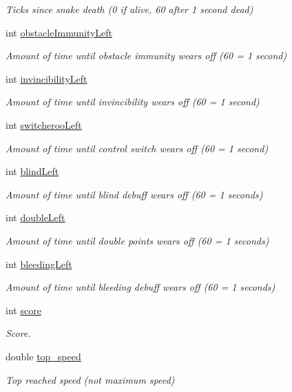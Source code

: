 \begin{DoxyCompactItemize}
\begin{DoxyCompactList}\small\item\em Ticks since snake death (0 if alive, 60 after 1 second dead) \end{DoxyCompactList}\item 
int \mbox{\hyperlink{group__snake_ga7296bc0cf6f2410a20eb48fda726a8f6}{obstacle\+Immunity\+Left}}
\begin{DoxyCompactList}\small\item\em Amount of time until obstacle immunity wears off (60 = 1 second) \end{DoxyCompactList}\item 
int \mbox{\hyperlink{group__snake_gae942bd8af663886b8e1c4274062174b5}{invincibility\+Left}}
\begin{DoxyCompactList}\small\item\em Amount of time until invincibility wears off (60 = 1 second) \end{DoxyCompactList}\item 
int \mbox{\hyperlink{group__snake_ga66233a102458e305c73cbfdb6d40100f}{switcheroo\+Left}}
\begin{DoxyCompactList}\small\item\em Amount of time until control switch wears off (60 = 1 second) \end{DoxyCompactList}\item 
int \mbox{\hyperlink{group__snake_gadc0bae4f8aea84e975419c3186008be3}{blind\+Left}}
\begin{DoxyCompactList}\small\item\em Amount of time until blind debuff wears off (60 = 1 seconds) \end{DoxyCompactList}\item 
int \mbox{\hyperlink{group__snake_gadc6fa6383ebace6fbeb2e6a2ebcbb04a}{double\+Left}}
\begin{DoxyCompactList}\small\item\em Amount of time until double points wears off (60 = 1 seconds) \end{DoxyCompactList}\item 
int \mbox{\hyperlink{group__snake_ga7b1c76ccd41a023734f3fe689279bace}{bleeding\+Left}}
\begin{DoxyCompactList}\small\item\em Amount of time until bleeding debuff wears off (60 = 1 seconds) \end{DoxyCompactList}\item 
int \mbox{\hyperlink{group__snake_gae5b13aadb0092ce8c45e04de9024444f}{score}}
\begin{DoxyCompactList}\small\item\em Score. \end{DoxyCompactList}\item 
double \mbox{\hyperlink{group__snake_ga26df95d629329c163a1153f81e1c8b17}{top\+\_\+speed}}
\begin{DoxyCompactList}\small\item\em Top reached speed (not maximum speed) \end{DoxyCompactList}\end{DoxyCompactItemize}


